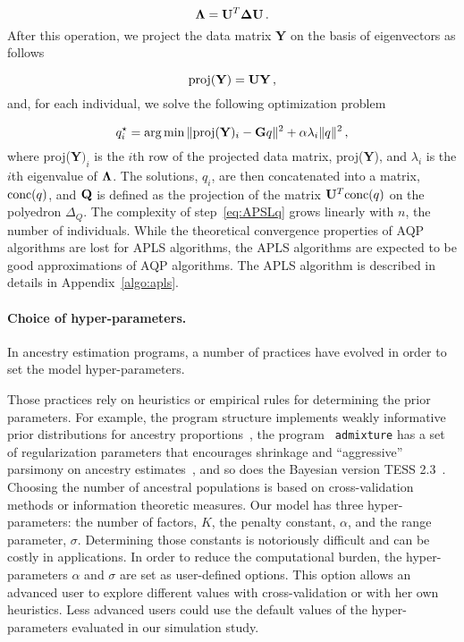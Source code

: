 $$
{\bf \Lambda} = {\bf U}^T {\bf \Delta} {\bf U} \, .
$$
\noindent  After this operation, we project the data matrix {\bf Y} on the basis of eigenvectors as follows

$$
{\rm proj} ({\bf Y}) = {\bf U}{\bf Y} \, , 
$$
\noindent and, for each individual, we solve the following optimization problem

\begin{equation}
q_i^\star = \arg \min  \|  {\rm proj} ({\bf Y})_i  - {\bf G} q \|^2 + \alpha \lambda_i \| q \|^2  \, ,
\label{eq:APSLq}
\end{equation}
\noindent where proj({\bf Y}$)_i$ is the $i$th row of the projected data matrix,
proj({\bf Y}), and $\lambda_i$ is the $i$th eigenvalue of ${\bf \Lambda}$. The
solutions, $q_i$, are then concatenated into a matrix, ${\rm conc}(q)$, and
${\bf Q}$ is defined as the projection of the matrix ${\bf U}^T {\rm conc}(q)$
on the polyedron $\Delta_Q$. The complexity of step~\eqref{eq:APSLq} grows
linearly with $n$, the number of individuals. While the theoretical convergence
properties of AQP algorithms are lost for APLS algorithms, the APLS algorithms
are expected to be good approximations of AQP algorithms. The APLS algorithm is
described in details in Appendix~\ref{algo:apls}.


\paragraph{Choice of hyper-parameters.} In ancestry estimation programs, a
number of practices have evolved in order to set the model hyper-parameters.

Those practices rely on heuristics or empirical rules for determining the prior
parameters. For example, the program structure implements weakly informative
prior distributions for ancestry proportions~\citep{wang2017}, the program {\tt
  admixture} has a set of regularization parameters that encourages shrinkage
and “aggressive” parsimony on ancestry estimates~\citep{Alexander2011}, and so
does the Bayesian version TESS 2.3~\citep{Durand2009}. Choosing the number of
ancestral populations is based on cross-validation methods or information
theoretic measures. Our model has three hyper-parameters: the number of factors,
$K$, the penalty constant, $\alpha$, and the range parameter, $\sigma$.
Determining those constants is notoriously difficult and can be costly in
applications. In order to reduce the computational burden, the hyper-parameters
$\alpha$ and $\sigma$ are set as user-defined options. This option allows an
advanced user to explore different values with cross-validation or with her own
heuristics. Less advanced users could use the default values of the
hyper-parameters evaluated in our simulation study.
 


